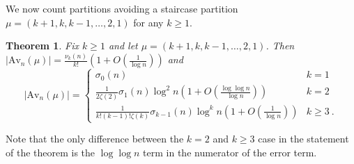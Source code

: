 \documentclass{article}
\theoremstyle{plain}
\newtheorem{theorem}{Theorem}[section]
\theoremstyle{definition}
\newcommand{\Av}{\text{Av}}
\begin{document}
We now count partitions avoiding a staircase partition $\mu=(k+1,k,k-1,\ldots, 2,1)$ for any $k\geq 1$.


\begin{theorem}\label{thm:staircase}
Fix $k\geq 1$ and let $\mu=(k+1,k,k-1,\ldots, 2,1)$.  Then $|\Av_n(\mu)| = \frac{\nu_k(n)}{k!}\left(1+O\left(\frac{1}{\log n}\right)\right)$ and 
\begin{equation}|\Av_n(\mu)| =\begin{cases}
\sigma_0(n) & k=1  \\
\frac{1}{2\zeta(2)}\sigma_{1}(n)\log^2 n\left(1+O\left(\frac{\log \log n}{\log n}\right)\right) & k=2 \\
\frac{1}{k!(k-1)!\zeta(k)}\sigma_{k-1}(n)\log^k n\left(1+O\left(\frac{1}{\log n}\right)\right) & k\geq 3  \ .
\end{cases} \label{eq:stairasymp} \end{equation}

\end{theorem}

Note that the only difference between the $k=2$ and $k\geq 3$ case in the statement of the theorem is the $\log \log n$ term in the numerator of the error term.
\end{document}
